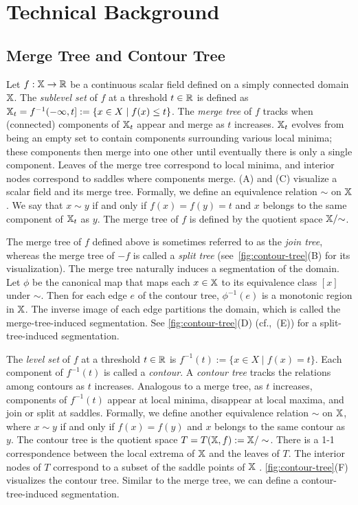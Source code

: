 \section{Technical Background}
\label{sec:background}

\subsection{Merge Tree and Contour Tree}
\label{sec:merge-and-contour-tree}
Let $f:\mathbb{X} \rightarrow \mathbb{R}$ be a continuous scalar field defined on a simply connected domain $\mathbb{X}$. 
The \emph{sublevel set} of $f$ at a threshold $t \in \mathbb{R}$ is defined as 
$\mathbb{X}_t = f^{-1}(-\infty,t] := \{ x \in X \mid f(x) \leq t \}$. 
The \emph{merge tree} of $f$ tracks when (connected) components of $\mathbb{X}_t$ appear and merge as $t$ increases. 
$\mathbb{X}_t$ evolves from being an empty set to contain components surrounding various local minima; these components then merge into one other until eventually there is only a single component.
Leaves of the merge tree correspond to local minima, and interior nodes correspond to saddles where components merge. 
(A) and (C) visualize a scalar field and its merge tree.
Formally, we define an equivalence relation $\sim$ on $\mathbb{X}$. We say that $x \sim y$ if and only if $f(x) = f(y)=t$ and $x$ belongs to the same component of $\mathbb{X}_t$ as $y$. The merge tree of $f$ is defined by the quotient space $\mathbb{X}/{\sim}$. 

The merge tree of $f$ defined above is sometimes referred to as the \emph{join tree}, whereas the merge tree of $-f$ is called a \emph{split tree} (see~\cref{fig:contour-tree}(B) for its visualization). The merge tree naturally induces a segmentation of the domain. Let $\phi$ be the canonical map that maps each $x \in \mathbb{X}$ to its equivalence class $[x]$ under $\sim$. Then for each edge $e$ of the contour tree, $\phi^{-1}(e)$ is a monotonic region in $\mathbb{X}$. The inverse image of each edge partitions the domain, which is called the merge-tree-induced segmentation. See \cref{fig:contour-tree}(D) (cf.,~(E)) for a split-tree-induced segmentation.

The \emph{level set} of $f$ at a threshold $t \in \mathbb{R}$ is $f^{-1}(t):= \{ x \in X \mid f(x) = t \}$.
Each component of $f^{-1}(t)$ is called a \emph{contour}. 
A \emph{contour tree} tracks the relations among contours as $t$ increases. 
Analogous to a merge tree, as $t$ increases, components of $f^{-1}(t)$ appear at local minima, disappear at local maxima, and join or split at saddles. 
Formally, we define another equivalence relation $\sim$ on $\mathbb{X}$, where $x \sim y$ if and only if $f(x) = f(y)$ and $x$ belongs to the same contour as $y$. 
The contour tree is the quotient space $T=T(\mathbb{X},f):= \mathbb{X} / \sim$. 
There is a 1-1 correspondence between the local extrema of $\mathbb{X}$ and the leaves of $T$. The interior nodes of $T$ correspond to a subset of the saddle points of $\mathbb{X}$ \cite{reeb1946points}. \cref{fig:contour-tree}(F) visualizes the contour tree. Similar to the merge tree, we can define a contour-tree-induced segmentation.

